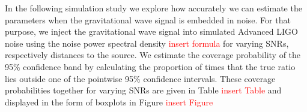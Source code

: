 
In the following simulation study we explore how accurately we can estimate the parameters
when the gravitational wave signal is embedded in noise.
For that purpose, we inject the gravitational wave signal into  simulated Advanced LIGO noise
using the noise power spectral density \textcolor{red}{insert formula} for varying
SNRs, respectively distances to the source. We estimate the coverage probability of the 95\%
confidence band by calculating the proportion of times that the true ratio lies outside one
of the pointwise 95\% confidence intervals.
These coverage probabilities together for varying SNRs are given in Table
\textcolor{red}{insert Table} and displayed in the form of boxplots in Figure
\textcolor{red}{insert Figure}





